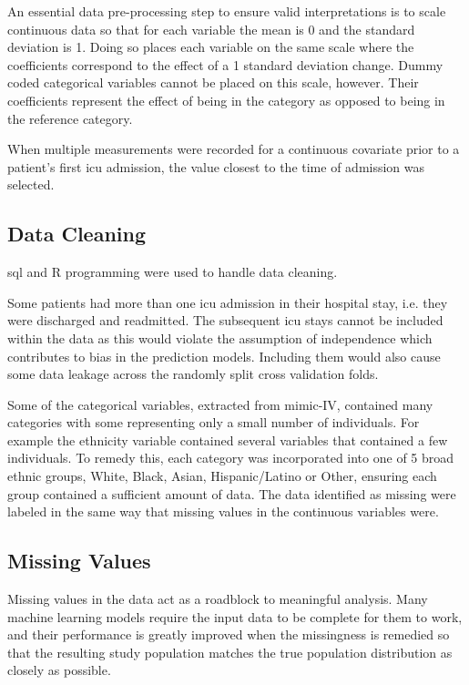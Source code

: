 \documentclass[11pt]{article}
\begin{document}
An essential data pre-processing step to ensure valid interpretations is to scale continuous data so that for each variable the mean is 0 and the standard deviation is 1. Doing so places each variable on the same scale where the coefficients correspond to the effect of a 1 standard deviation change\cite{Gelman2008}. Dummy coded categorical variables cannot be placed on this scale, however. Their coefficients represent the effect of being in the category as opposed to being in the reference category.

When multiple measurements were recorded for a continuous covariate prior to a patient’s first \gls{icu} admission, the value closest to the time of admission was selected.

\subsection{Data Cleaning}
\gls{sql} and R programming were used to handle data cleaning.

Some patients had more than one \gls{icu} admission in their hospital stay, i.e. they were discharged and readmitted. The subsequent \gls{icu} stays cannot be included within the data as this would violate the assumption of independence\cite{Pfeifer2010} which contributes to bias in the prediction models. Including them would also cause some data leakage across the randomly split cross validation folds.

Some of the categorical variables, extracted from \gls{mimic}-IV, contained many categories with some representing only a small number of individuals. For example the ethnicity variable contained several variables that contained a few individuals. To remedy this, each category was incorporated into one of 5 broad ethnic groups, White, Black, Asian, Hispanic/Latino or Other, ensuring each group contained a sufficient amount of data. The data identified as missing were labeled in the same way that missing values in the continuous variables were.

\subsection{Missing Values}
Missing values in the data act as a roadblock to meaningful analysis. Many machine learning models require the input data to be complete for them to work, and their performance is greatly improved when the missingness is remedied so that the resulting study population matches the true population distribution as closely as possible\cite{Hasan2021}.
\end{document}
